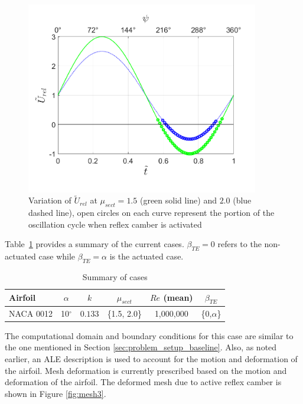 \begin{figure}[H]
\centering
\texttt{}		\includegraphics[width=4in]{figures/U_rel_vs_t_tilde_without_lines.png}
		\caption{Variation of $\tilde{U}_{rel}$ at $\mu_{sect}=1.5$ (green solid line) and $2.0$ (blue dashed line), open circles on each curve represent the portion of the oscillation cycle when reflex camber is activated}
		\label{fig:U_rel}
\end{figure}



Table~\ref{table:summary_cases_AC} provides a summary of the current cases. $\beta_{TE}=0$ refers to the non-actuated case while $\beta_{TE}=\alpha$ is the actuated case.

\begin{table}[H]
	\centering
	\caption{Summary of cases}
	\label{table:summary_cases_AC}
	\begin{tabular}{|l|c|c|c|c|c|}
		\hline
		Airfoil   & $\alpha$ & $k$ & $\mu_{sect}$ & $Re$ (mean) & $\beta_{TE}$\\
		\hline
		\hline
		NACA 0012 & 10$^\circ$ & $0.133$ & \{1.5, 2.0\} & 1,000,000 & \{0,$\alpha$\} \\
		\hline
		
	\end{tabular}
	
\end{table}

The computational domain and boundary conditions for this case are similar to the one mentioned in Section \ref{sec:problem_setup_baseline}.
Also, as noted earlier, an ALE description is used to account for the motion and deformation of the airfoil.
Mesh deformation is currently prescribed based on the motion and deformation of the airfoil.
The deformed mesh due to active reflex camber is shown in Figure \ref{fig:mesh3}.

